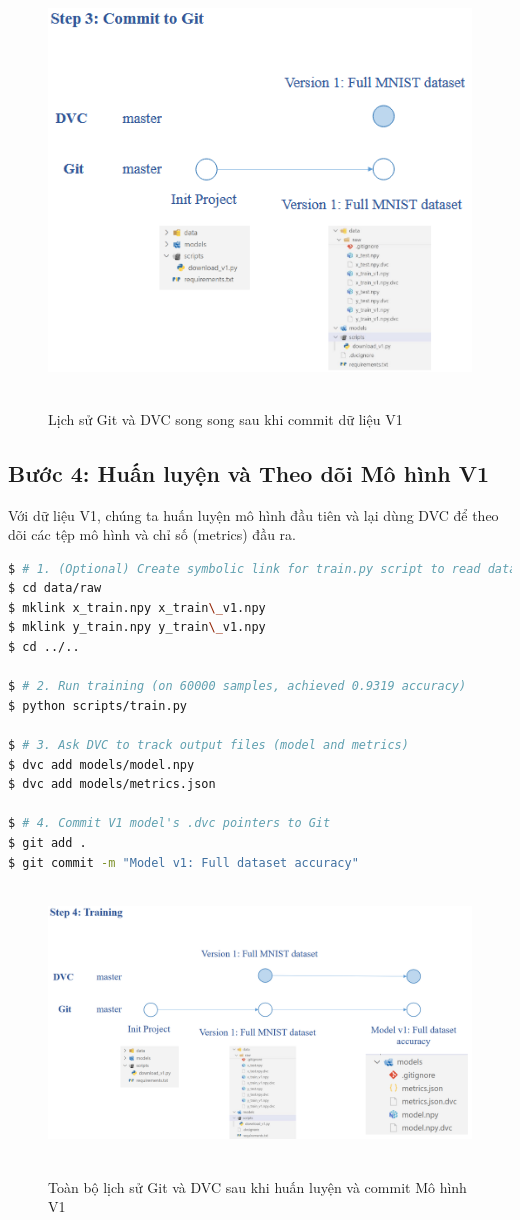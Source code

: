 \documentclass[11pt]{article}
\begin{document}
\begin{figure}[H]
    \centering
    \includegraphics[width=0.7\linewidth]{images/p7.png}
    \caption{Lịch sử Git và DVC song song sau khi commit dữ liệu V1}
\end{figure}

\subsection{Bước 4: Huấn luyện và Theo dõi Mô hình V1}
Với dữ liệu V1, chúng ta huấn luyện mô hình đầu tiên và lại dùng DVC để theo dõi các tệp mô hình và chỉ số (metrics) đầu ra.

\begin{lstlisting}[language=bash]
$ # 1. (Optional) Create symbolic link for train.py script to read data
$ cd data/raw
$ mklink x_train.npy x_train\_v1.npy
$ mklink y_train.npy y_train\_v1.npy
$ cd ../..

$ # 2. Run training (on 60000 samples, achieved 0.9319 accuracy)
$ python scripts/train.py

$ # 3. Ask DVC to track output files (model and metrics)
$ dvc add models/model.npy
$ dvc add models/metrics.json

$ # 4. Commit V1 model's .dvc pointers to Git
$ git add .
$ git commit -m "Model v1: Full dataset accuracy"
\end{lstlisting}

\begin{figure}[H]
    \centering
    \includegraphics[width=0.7\linewidth]{images/p10.png}
    \caption{Toàn bộ lịch sử Git và DVC sau khi huấn luyện và commit Mô hình V1}
\end{figure}
\end{document}

